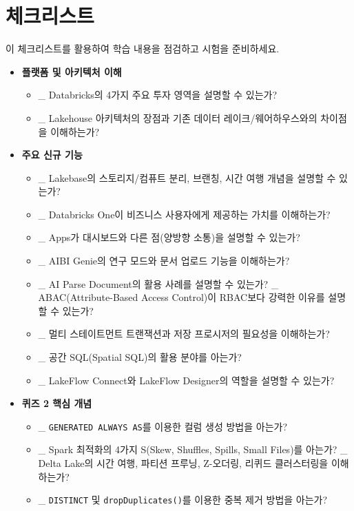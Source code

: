 \documentclass[11pt,a4paper]{article}
\theoremstyle{definition}
\begin{document}
\newpage
\section*{체크리스트}

이 체크리스트를 활용하여 학습 내용을 점검하고 시험을 준비하세요.

\begin{itemize}
    \item \textbf{플랫폼 및 아키텍처 이해}
    \begin{itemize}
        \item \_ Databricks의 4가지 주요 투자 영역을 설명할 수 있는가?
        \item \_ Lakehouse 아키텍처의 장점과 기존 데이터 레이크/웨어하우스와의 차이점을 이해하는가?
    \end{itemize}
    \item \textbf{주요 신규 기능}
    \begin{itemize}
        \item \_ Lakebase의 스토리지/컴퓨트 분리, 브랜칭, 시간 여행 개념을 설명할 수 있는가?
        \item \_ Databricks One이 비즈니스 사용자에게 제공하는 가치를 이해하는가?
        \item \_ Apps가 대시보드와 다른 점(양방향 소통)을 설명할 수 있는가?
        \item \_ AIBI Genie의 연구 모드와 문서 업로드 기능을 이해하는가?
        \item \_ AI Parse Document의 활용 사례를 설명할 수 있는가?
        \_ ABAC(Attribute-Based Access Control)이 RBAC보다 강력한 이유를 설명할 수 있는가?
        \item \_ 멀티 스테이트먼트 트랜잭션과 저장 프로시저의 필요성을 이해하는가?
        \item \_ 공간 SQL(Spatial SQL)의 활용 분야를 아는가?
        \item \_ LakeFlow Connect와 LakeFlow Designer의 역할을 설명할 수 있는가?
    \end{itemize}
    \item \textbf{퀴즈 2 핵심 개념}
    \begin{itemize}
        \item \_ \texttt{GENERATED ALWAYS AS}를 이용한 컬럼 생성 방법을 아는가?
        \item \_ Spark 최적화의 4가지 S(Skew, Shuffles, Spills, Small Files)를 아는가?
        \_ Delta Lake의 시간 여행, 파티션 프루닝, Z-오더링, 리퀴드 클러스터링을 이해하는가?
        \item \_ \texttt{DISTINCT} 및 \texttt{dropDuplicates()}를 이용한 중복 제거 방법을 아는가?

\end{itemize}
\end{itemize}
\end{document}
